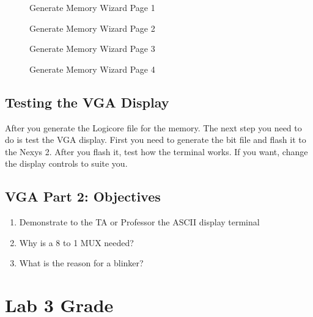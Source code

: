 \documentclass{article}
\begin{document}
\begin{figure}[!htbp]
  \centering
  \caption{Generate Memory Wizard Page 1}
\end{figure}

\begin{figure}[!htbp]
  \centering
  \caption{Generate Memory Wizard Page 2}
\end{figure}

\begin{figure}[!htbp]
  \centering
  \caption{Generate Memory Wizard Page 3}
\end{figure}

\begin{figure}[!htbp]
  \centering
  \caption{Generate Memory Wizard Page 4}
\end{figure}

\newpage
\subsection{Testing the VGA Display}
After you generate the Logicore file for the memory. The next step you need to do is test the VGA display. First you need to generate the bit file and flash it to the Nexys 2. After you flash it, test how the terminal works. If you want, change the display controls to suite you.

\subsection{VGA Part 2: Objectives}

\begin{enumerate}
  \item Demonstrate to the TA or Professor the ASCII display terminal
  \item Why is a 8 to 1 MUX needed?
  \item What is the reason for a blinker?
\end{enumerate}

\newpage

\section{Lab 3 Grade}
\end{document}
